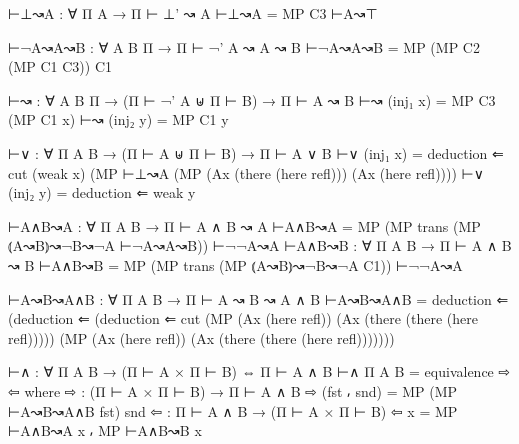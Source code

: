 \begin{spverbatim}
⊢⊥↝A : ∀ {Π A} → Π ⊢ ⊥' ↝ A
⊢⊥↝A = MP C3 ⊢A↝⊤

⊢¬A↝A↝B : ∀ {A B Π} → Π ⊢ ¬' A ↝ A ↝ B
⊢¬A↝A↝B = MP (MP C2 (MP C1 C3)) C1

⊢↝ : ∀ {A B Π} → (Π ⊢ ¬' A ⊎ Π ⊢ B) → Π ⊢ A ↝ B
⊢↝ (inj₁ x) = MP C3 (MP C1 x)
⊢↝ (inj₂ y) = MP C1 y

⊢∨ : ∀ {Π A B} → (Π ⊢ A ⊎ Π ⊢ B) → Π ⊢ A ∨ B
⊢∨ (inj₁ x) = deduction ⇐ cut (weak x) (MP ⊢⊥↝A (MP (Ax (there (here refl)))
 (Ax (here refl))))
⊢∨ (inj₂ y) = deduction ⇐ weak y

⊢A∧B↝A : ∀ {Π A B} → Π ⊢ A ∧ B ↝ A
⊢A∧B↝A = MP (MP trans (MP ⦅A↝B⦆↝¬B↝¬A ⊢¬A↝A↝B)) ⊢¬¬A↝A
⊢A∧B↝B : ∀ {Π A B} → Π ⊢ A ∧ B ↝ B
⊢A∧B↝B = MP (MP trans (MP ⦅A↝B⦆↝¬B↝¬A C1)) ⊢¬¬A↝A

⊢A↝B↝A∧B : ∀ {Π A B} → Π ⊢ A ↝ B ↝ A ∧ B
⊢A↝B↝A∧B = deduction ⇐ (deduction ⇐ (deduction ⇐ cut (MP (Ax (here refl))
  (Ax (there (there (here refl))))) (MP (Ax (here refl))
  (Ax (there (there (here refl)))))))

⊢∧ : ∀ {Π A B} → (Π ⊢ A × Π ⊢ B) ⇔ Π ⊢ A ∧ B
⊢∧ {Π} {A} {B} = equivalence ⇨ ⇦
  where
  ⇨ : (Π ⊢ A × Π ⊢ B) → Π ⊢ A ∧ B
  ⇨ (fst ⸴ snd) = MP (MP ⊢A↝B↝A∧B fst) snd
  ⇦ : Π ⊢ A ∧ B → (Π ⊢ A × Π ⊢ B)
  ⇦ x = MP ⊢A∧B↝A x ⸴ MP ⊢A∧B↝B x
\end{spverbatim}
